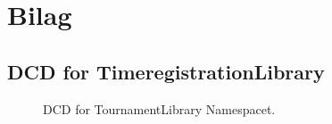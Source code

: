 
\section{Bilag}
\subsection{DCD for TimeregistrationLibrary}


\begin{figure}[H]
    \caption{DCD for TournamentLibrary Namespacet.}
    \label{fig:DCDLib}
\end{figure}